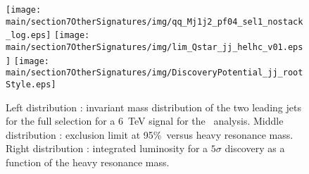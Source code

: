 \begin{figure}[htbp]
  \centering
  \texttt{[image: \\main/section7OtherSignatures/img/qq\_Mj1j2\_pf04\_sel1\_nostack\_log.eps]}
  \texttt{[image: \\main/section7OtherSignatures/img/lim\_Qstar\_jj\_helhc\_v01.eps]}
  \texttt{[image: \\main/section7OtherSignatures/img/DiscoveryPotential\_jj\_rootStyle.eps]}
  \caption{Left distribution : invariant mass distribution of the two leading jets for the full selection for a 6~TeV signal for the \qjj\ analysis. Middle distribution : exclusion limit at 95\%~\cl versus heavy resonance mass. Right distribution : integrated luminosity for a $5\sigma$ discovery as a function of the heavy resonance mass.}
  \label{fig:hadronicresonances:qqsel01}
\end{figure}

\begin{table}[!htb]\centering
{}
\caption{Final yield of analysis.}
\label{tab:qqYield}
\end{table}

